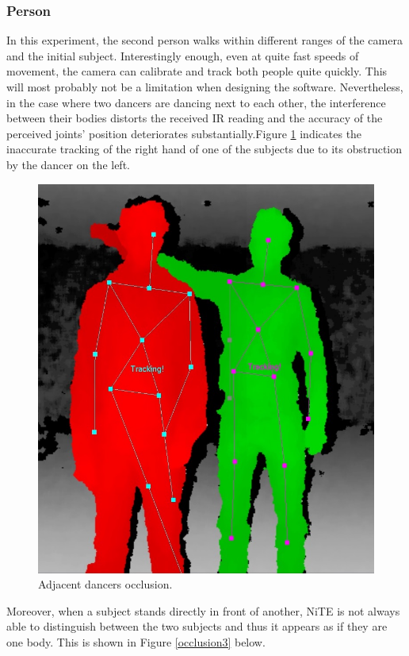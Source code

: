\documentclass[a4paper]{article}
\begin{document}
\subsubsection{Person}
\noindent
In this experiment, the second person walks within different ranges of the camera and the initial subject. Interestingly enough, even at quite fast speeds of movement, the camera can calibrate and track both people quite quickly. This will most probably not be a limitation when designing the software. Nevertheless, in the case where two dancers are dancing next to each other, the interference between their bodies distorts the received IR reading and the accuracy of the perceived joints' position deteriorates substantially.Figure \ref{occlusion1} indicates the inaccurate tracking of the right hand of one of the subjects due to its obstruction by the dancer on the left.

\begin{figure}[H]
\center
\includegraphics[scale=0.2]{Occlusion1.jpg} 
\caption{Adjacent dancers occlusion.}
\label{occlusion1}
\end{figure} 

Moreover, when a subject stands directly in front of another, NiTE is not always able to distinguish between the two subjects and thus it appears as if they are one body. This is shown in Figure \ref{occlusion3} below.
\end{document}
